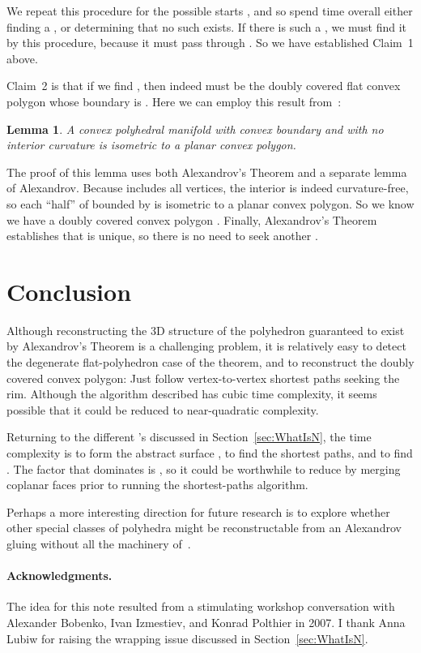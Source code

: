 \pdfoutput=1  \documentclass[]{article}
\newtheorem{lemma}{Lemma}
\newcommand{\seclab}[1]{\label{sec:#1}}
\newcommand{\secref}[1]{\ref{sec:#1}}
\begin{document}
We repeat this procedure for the  possible starts ,
and so spend  time overall either finding a , or determining
that
no such  exists.  If there is such a , we
must find it by this procedure, because it must pass through .
So we have established Claim~1 above.

Claim~2 is that if we find , then indeed  must be the doubly
covered flat convex polygon whose boundary is .
Here we can employ this result from~\cite[Cor.~4]{iov-sucpql-10}:

\begin{lemma}
A convex polyhedral manifold with convex boundary and with no interior
curvature
is isometric to a planar convex polygon.
\end{lemma}

\noindent
The proof of this lemma uses both Alexandrov's Theorem and a 
separate lemma of Alexandrov.
Because  includes all vertices, the interior is indeed curvature-free,
so each ``half'' of  bounded by  is isometric to a planar
convex polygon.
So we know we have a doubly covered convex polygon .
Finally, Alexandrov's Theorem establishes that  is unique, so there
is no need to seek another .


\section{Conclusion}
\seclab{Conclusion}
Although reconstructing the 3D structure of the polyhedron guaranteed to
exist
by Alexandrov's Theorem is a challenging problem, it is relatively
easy
to detect the degenerate flat-polyhedron case of the theorem,
and to reconstruct the doubly covered convex polygon:
Just follow vertex-to-vertex shortest paths seeking the rim.
Although the algorithm described has cubic time complexity,
it seems possible that it could be reduced to near-quadratic
complexity.

Returning to the different 's discussed in Section~\secref{WhatIsN},
the time complexity is  to form the abstract surface ,
 to find the shortest paths, and  to find .
The factor that dominates is , so it could be worthwhile
to reduce  by merging coplanar faces prior to running
the shortest-paths algorithm.

Perhaps a more interesting direction for future research is to explore
whether other special classes of polyhedra  might be
reconstructable from an Alexandrov gluing
without all the machinery of~\cite{bi-atwdt-06}.


\paragraph{Acknowledgments.}
The idea for this note resulted from a stimulating 
workshop conversation
with
Alexander Bobenko,
Ivan Izmestiev, and
Konrad Polthier in 2007.
I thank Anna Lubiw for raising the wrapping issue
discussed in Section~\secref{WhatIsN}.



\end{document}
